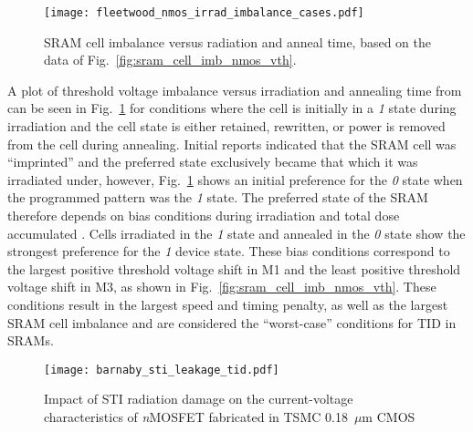 \begin{figure}[tb]
    \begin{center}
        \texttt{[image: fleetwood\_nmos\_irrad\_imbalance\_cases.pdf]}
    \end{center}
    \caption{SRAM cell imbalance versus radiation and anneal time, based on the data of Fig.~\ref{fig:sram_cell_imb_nmos_vth}.}
    \label{fig:sram_cell_imb}
\end{figure}

A plot of threshold voltage imbalance versus irradiation and annealing time from \cite{Fleetwood:1987cfa} can be seen in Fig.~\ref{fig:sram_cell_imb} for conditions where the cell is initially in a \emph{1} state during irradiation and the cell state is either retained, rewritten, or power is removed from the cell during annealing.
Initial reports indicated that the SRAM cell was ``imprinted'' and the preferred state exclusively became that which it was irradiated under, however, Fig.~\ref{fig:sram_cell_imb} shows an initial preference for the \emph{0} state when the programmed pattern was the \emph{1} state. 
The preferred state of the SRAM therefore depends on bias conditions during irradiation and total dose accumulated \cite{Fleetwood:1987cfa}.
Cells irradiated in the \emph{1} state and annealed in the \emph{0} state show the strongest preference for the \emph{1} device state.
These bias conditions correspond to the largest positive threshold voltage shift in M1 and the least positive threshold voltage shift in M3, as shown in Fig.~\ref{fig:sram_cell_imb_nmos_vth}.
These conditions result in the largest speed and timing penalty, as well as the largest SRAM cell imbalance and are considered the ``worst-case'' conditions for TID in SRAMs.

\begin{figure}[tb]
    \begin{center}
        \texttt{[image: barnaby\_sti\_leakage\_tid.pdf]}
    \end{center}
    \caption[Impact of STI radiation damage on the current-voltage characteristics of \emph{n}MOSFET fabricated in TSMC 0.18~$\mu$m CMOS.]{Impact of STI radiation damage on the current-voltage characteristics of \emph{n}MOSFET fabricated in TSMC 0.18~$\mu$m CMOS \cite{Barnaby:2006cp}}
    \label{fig:tid_sti_leak}
\end{figure}

